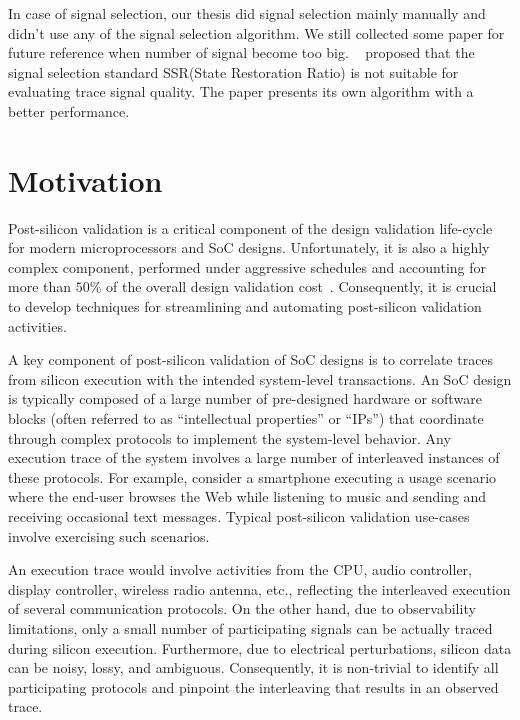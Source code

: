 \documentclass[12pt,frontmatter,copyright,thesis]{usfmanus}
\begin{document}
In case of signal selection, our thesis did signal selection mainly manually
and didn't use any of the signal selection algorithm. We still collected some
paper for future reference when number of signal become too big. ~\cite{forestMa} proposed that 
the signal selection standard SSR(State Restoration Ratio) is not suitable
for evaluating trace signal quality. The paper presents its own algorithm with 
a better performance.



\section{Motivation}

Post-silicon validation is a critical
component of the design validation life-cycle for modern
microprocessors and SoC designs.  Unfortunately, it is also
a highly complex component, performed under aggressive
schedules and accounting for more than $50\%$ of the overall
design validation cost~\cite{Patra2007}.  Consequently, it
is crucial to develop techniques for streamlining and
automating post-silicon validation activities.



A key component of post-silicon validation of SoC designs is
to correlate traces from silicon execution with the intended
system-level transactions.  An SoC design is typically
composed of a large number of pre-designed hardware or
software blocks (often referred to as ``intellectual
properties'' or ``IPs'') that coordinate through complex
protocols to implement the system-level behavior.  Any
execution trace of the system involves a large number of
interleaved instances of these protocols.  For example,
consider a smartphone executing a usage scenario where the
end-user browses the Web while listening to music and
sending and receiving occasional text messages.  Typical
post-silicon validation use-cases involve exercising such
scenarios. 

 An execution trace would involve activities from
the CPU, audio controller, display controller, wireless
radio antenna, etc., reflecting the interleaved execution of
several communication protocols.  On the other hand, due to
observability limitations, only a small number of
participating signals can be actually traced during silicon
execution.  Furthermore, due to electrical perturbations,
silicon data can be noisy, lossy, and ambiguous.
Consequently, it is non-trivial to identify all
participating protocols and pinpoint the interleaving that
results in an observed trace.
\end{document}
